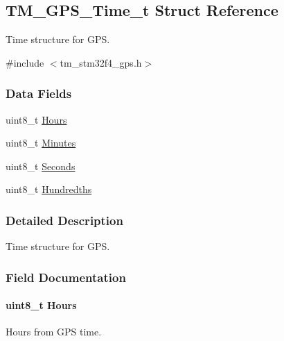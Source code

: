 \hypertarget{struct_t_m___g_p_s___time__t}{}\subsection{T\+M\+\_\+\+G\+P\+S\+\_\+\+Time\+\_\+t Struct Reference}
\label{struct_t_m___g_p_s___time__t}


Time structure for G\+P\+S.  




{\ttfamily \#include $<$tm\+\_\+stm32f4\+\_\+gps.\+h$>$}

\subsubsection*{Data Fields}
\begin{DoxyCompactItemize}
\item 
uint8\+\_\+t \hyperlink{struct_t_m___g_p_s___time__t_a836edba653a6aa73789d68e7bd2ee757}{Hours}
\item 
uint8\+\_\+t \hyperlink{struct_t_m___g_p_s___time__t_a37e1bd6f0ab1dcc18f95f8d0193cd26e}{Minutes}
\item 
uint8\+\_\+t \hyperlink{struct_t_m___g_p_s___time__t_a42120bdc40e6f49bb5b4dec78220c87b}{Seconds}
\item 
uint8\+\_\+t \hyperlink{struct_t_m___g_p_s___time__t_acfd414f306366a8035e66ef450a57836}{Hundredths}
\end{DoxyCompactItemize}


\subsubsection{Detailed Description}
Time structure for G\+P\+S. 

\subsubsection{Field Documentation}
\hypertarget{struct_t_m___g_p_s___time__t_a836edba653a6aa73789d68e7bd2ee757}{}
\paragraph[{Hours}]{\setlength{\rightskip}{0pt plus 5cm}uint8\+\_\+t Hours}\label{struct_t_m___g_p_s___time__t_a836edba653a6aa73789d68e7bd2ee757}
Hours from G\+P\+S time. \hypertarget{struct_t_m___g_p_s___time__t_acfd414f306366a8035e66ef450a57836}{}
